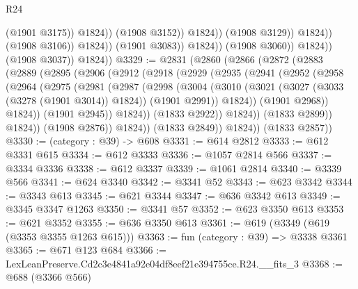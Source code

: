 \begin{lexlean}{R24}
\begin{coremodule}
                                              (@1901 @3175))
                                            @1824))
                                        (@1908 @3152))
                                      @1824))
                                  (@1908 @3129))
                                @1824))
                            (@1908 @3106))
                          @1824))
                      (@1901 @3083))
                    @1824))
                (@1908 @3060))
              @1824))
          (@1908 @3037))
        @1824))
@3329 := @2831
    (@2860
      (@2866
        (@2872
          (@2883
            (@2889
              (@2895
                (@2906
                  (@2912
                    (@2918
                      (@2929
                        (@2935
                          (@2941
                            (@2952
                              (@2958
                                (@2964
                                  (@2975
                                    (@2981
                                      (@2987
                                        (@2998
                                          (@3004
                                            (@3010
                                              (@3021
                                                (@3027 (@3033 (@3278 (@1901 @3014)) @1824))
                                                (@1901 @2991))
                                              @1824))
                                          (@1901 @2968))
                                        @1824))
                                    (@1901 @2945))
                                  @1824))
                              (@1833 @2922))
                            @1824))
                        (@1833 @2899))
                      @1824))
                  (@1908 @2876))
                @1824))
            (@1833 @2849))
          @1824))
      (@1833 @2857))
@3330 := (category : @39) -> @608
@3331 := @614 @2812
@3333 := @612 @3331 @615
@3334 := @612 @3333
@3336 := @1057 @2814 @566
@3337 := @3334 @3336
@3338 := @612 @3337
@3339 := @1061 @2814
@3340 := @3339 @566
@3341 := @624 @3340
@3342 := @3341 @52
@3343 := @623 @3342
@3344 := @3343 @613
@3345 := @621 @3344
@3347 := @636 @3342 @613
@3349 := @3345 @3347 @1263
@3350 := @3341 @57
@3352 := @623 @3350 @613
@3353 := @621 @3352
@3355 := @636 @3350 @613
@3361 := @619 (@3349 (@619 (@3353 @3355 @1263 @615)))
@3363 := fun (category : @39) => @3338 @3361
@3365 := @671 @123 @684
@3366 := LexLeanPreserve.Cd2c3e4841a92e04df8eef21e394755ce.R24.__fits_3
@3368 := @688 (@3366 @566)

\end{coremodule}
\end{lexlean}
